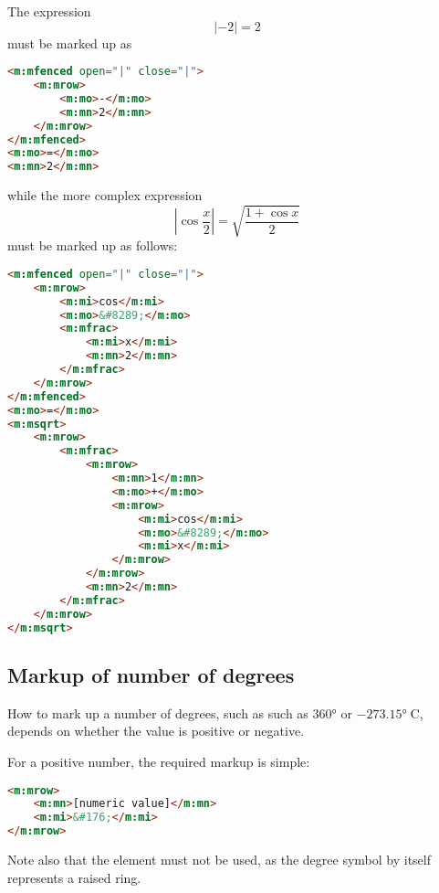 \documentclass[english,a4paper,11pt]{article}
\begin{document}
The expression 
\begin{equation}|-2| = 2\end{equation}
must be marked up as
\begin{lstlisting}[language=HTML, caption={Absolute values}]
<m:mfenced open="|" close="|">
	<m:mrow>
		<m:mo>-</m:mo>
		<m:mn>2</m:mn>
	</m:mrow>
</m:mfenced>
<m:mo>=</m:mo>
<m:mn>2</m:mn>
\end{lstlisting}
while the more complex expression
\begin{equation}
\left|\cos \frac{x}{2}\right| =\sqrt{\frac{1 + \cos x}{2}}
\end{equation}
must be marked up as follows:
\begin{lstlisting}[language=HTML]
<m:mfenced open="|" close="|">
	<m:mrow>
		<m:mi>cos</m:mi>
		<m:mo>&#8289;</m:mo>
		<m:mfrac>
			<m:mi>x</m:mi>
			<m:mn>2</m:mn>
		</m:mfrac>
	</m:mrow>
</m:mfenced>
<m:mo>=</m:mo>
<m:msqrt>
	<m:mrow>
		<m:mfrac>
			<m:mrow>
				<m:mn>1</m:mn>
				<m:mo>+</m:mo>
				<m:mrow>
					<m:mi>cos</m:mi>
					<m:mo>&#8289;</m:mo>
					<m:mi>x</m:mi>
				</m:mrow>
			</m:mrow>
			<m:mn>2</m:mn>
		</m:mfrac>
	</m:mrow>
</m:msqrt>
\end{lstlisting}

\subsection{Markup of number of degrees}

How to mark up a number of degrees, such as such as $\ang{360}$ or $\ang{-273,15}\;\text{C}$, depends on whether the value is positive or negative.

For a positive number, the required markup is simple:
\begin{lstlisting}[language=HTML]
<m:mrow>
	<m:mn>[numeric value]</m:mn>
	<m:mi>&#176;</m:mi>
</m:mrow>
\end{lstlisting}

Note also that the  element must not be used, as the degree symbol by itself represents a raised ring.
\end{document}
